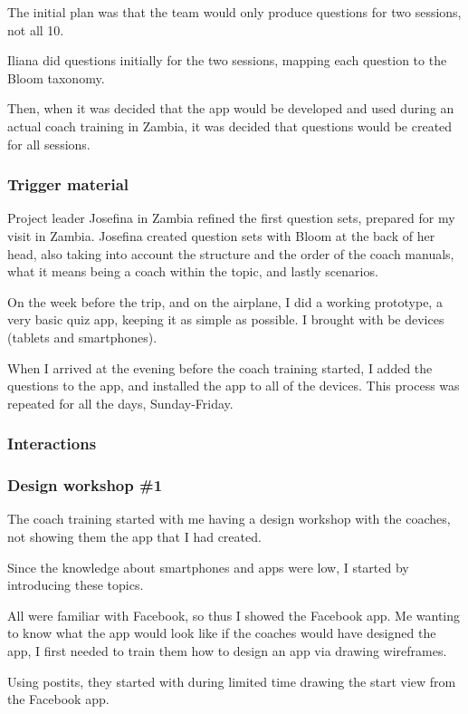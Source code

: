 The initial plan was that the team would only produce questions for two sessions, not all 10.

Iliana did questions initially for the two sessions, mapping each question to the Bloom taxonomy.

Then, when it was decided that the app would be developed and used during an actual coach training in Zambia, it was decided that questions would be created for all sessions.

\subsubsection*{Trigger material}
Project leader Josefina in Zambia refined the first question sets, prepared for my visit in Zambia. Josefina created question sets with Bloom at the back of her head, also taking into account the structure and the order of the coach manuals, what it means being a coach within the topic, and lastly scenarios.

On the week before the trip, and on the airplane, I did a working prototype, a very basic quiz app, keeping it as simple as possible. I brought with be devices (tablets and smartphones).

When I arrived at the evening before the coach training started, I added the questions to the app, and installed the app to all of the devices. This process was repeated for all the days, Sunday-Friday.

\subsubsection*{Interactions}

\subsubsection{Design workshop \#1}
The coach training started with me having a design workshop with the coaches, not showing them the app that I had created.

Since the knowledge about smartphones and apps were low, I started by introducing these topics.

All were familiar with Facebook, so thus I showed the Facebook app. Me wanting to know what the app would look like if the coaches would have designed the app, I first needed to train them how to design an app via drawing wireframes.

Using postits, they started with during limited time drawing the start view from the Facebook app.

